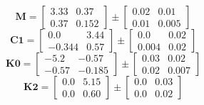 \documentclass[../../report/parameterReport.tex]{subfiles}
\begin{document}
\begin{equation}
\mathbf{M}=
\left[
\begin{array}{rr}
    3.33 & 0.37\\
    0.37 & 0.152
\end{array}
\right]
\pm
\left[
\begin{array}{rr}
    0.02 & 0.01\\
    0.01 & 0.005
\end{array}
\right]
\label{eq:M}
\end{equation}
\begin{equation}
\mathbf{C1}=
\left[
\begin{array}{rr}
    0.0 & 3.44\\
    -0.344 & 0.57
\end{array}
\right]
\pm
\left[
\begin{array}{rr}
    0.0 & 0.02\\
    0.004 & 0.02
\end{array}
\right]
\label{eq:C1}
\end{equation}
\begin{equation}
\mathbf{K0}=
\left[
\begin{array}{rr}
    -5.2 & -0.57\\
    -0.57 & -0.185
\end{array}
\right]
\pm
\left[
\begin{array}{rr}
    0.03 & 0.02\\
    0.02 & 0.007
\end{array}
\right]
\label{eq:K0}
\end{equation}
\begin{equation}
\mathbf{K2}=
\left[
\begin{array}{rr}
    0.0 & 5.15\\
    0.0 & 0.60
\end{array}
\right]
\pm
\left[
\begin{array}{rr}
    0.0 & 0.03\\
    0.0 & 0.02
\end{array}
\right]
\label{eq:K2}
\end{equation}
\end{document}
